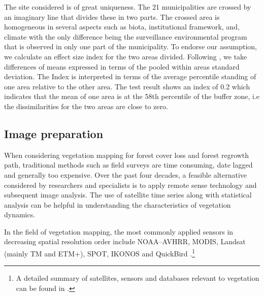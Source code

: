 The site considered is of great uniqueness. The 21 municipalities are crossed by an imaginary line that divides these in two parts. The crossed area is homogeneous in several aspects such as biota, institutional framework, and, climate with the only difference being the surveillance environmental program that is observed in only one part of the municipality. To endorse our assumption, we calculate an effect size index for the two areas divided. Following \citet{COHEN1977}, we take differences of means expressed in terms of the pooled within areas standard deviation. The Index is interpreted in terms of the average percentile standing of one area relative to the other area. The test result shows an index of 0.2 which indicates that the mean of one area is at the 58th percentile of the buffer zone, i.e the dissimilarities for the two areas are close to zero.

\subsection{Image preparation}  %

When considering vegetation mapping for forest cover loss and forest regrowth path, traditional methods such as field surveys are time consuming, date lagged and generally too expensive. Over the past four decades, a feasible alternative considered by researchers and specialists is to apply remote sense technology and subsequent image analysis. The use of satellite time series along with statistical analysis can be helpful in understanding the characteristics of vegetation dynamics.


In the field of vegetation mapping, the most commonly applied sensors in decreasing spatial resolution order include NOAA–AVHRR, MODIS, Landsat (mainly TM and ETM+), SPOT, IKONOS  and QuickBird \citep{xie_sha_yu_2008}.\footnote{A detailed summary of satellites, sensors and databases relevant to vegetation can be found in \citet{horning_2010}.}

